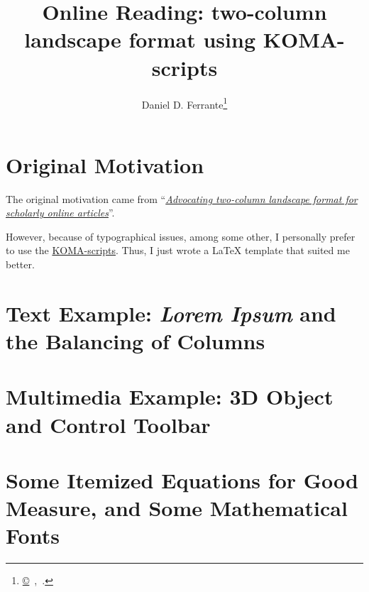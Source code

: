 \documentclass[       %
  paper=279mm:216mm,  %
  fontsize=12pt,      %
  twoside,
  pagesize=auto,           %
  version=last,
  numbers=noendperiod,%
  captions=nooneline, %
  DIV=calc
]{scrartcl}
\title{Online Reading: two-column landscape format using KOMA-scripts}
\author{\sffamily Daniel D. Ferrante\footnote{
  \href{http://www.het.brown.edu/people/danieldf/}{\copyright}\; \semver\,,\;
  \href{http://creativecommons.org/licenses/by-nc-sa/3.0/}{\ccbyncsa}\,.}}
\date{\sffamily\todayiso}
\begin{document}
%
\maketitle
%
\begin{multicols}{2}
  \tableofcontents


  \section{Original Motivation}
  The original motivation came from
  ``\href{http://scholardox.wordpress.com/2013/05/29/two-column-landscape-should-be-the-standard-format-of-scholarly-online-articles/}
    {\emph{Advocating two-column landscape format for scholarly online articles}}''.
    
  However, because of typographical issues, among some other, I personally prefer
  to use the \href{http://www.ctan.org/pkg/koma-script}{KOMA-scripts}. Thus, I
  just wrote a \LaTeX\/ template that suited me better.


  \section{Text Example: \textit{Lorem Ipsum} and the Balancing of Columns}

  \lipsum
  

  \section{Multimedia Example: 3D Object and Control Toolbar}

  

  \section{Some Itemized Equations for Good Measure, and Some Mathematical Fonts}


\end{multicols}
\end{document}
